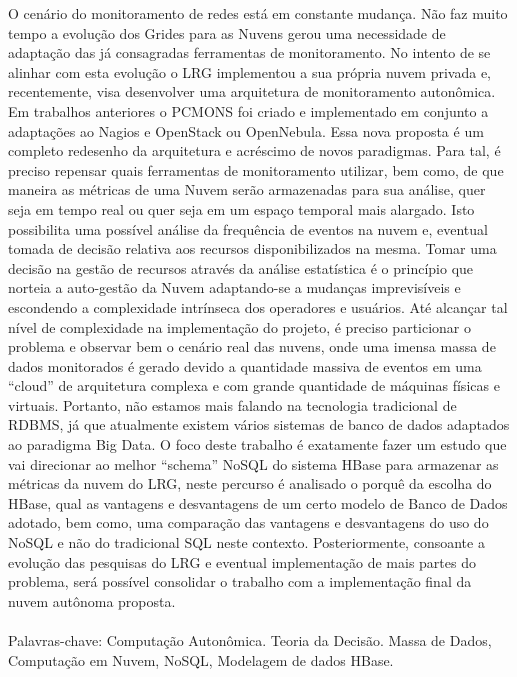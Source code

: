 \begin{resumo}

O cenário do monitoramento de redes está em constante mudança. Não faz muito
tempo a evolução dos Grides para as Nuvens gerou uma necessidade de adaptação
das já consagradas ferramentas de monitoramento. No intento de se alinhar com
esta evolução o LRG implementou a sua própria nuvem privada e, recentemente,
visa desenvolver uma arquitetura de monitoramento autonômica. Em trabalhos
anteriores o PCMONS foi criado e implementado em conjunto a adaptações ao Nagios
e OpenStack ou OpenNebula. Essa nova proposta é um completo redesenho da
arquitetura e acréscimo de novos paradigmas. Para tal, é preciso repensar quais
ferramentas de monitoramento utilizar, bem como, de que maneira as métricas de
uma Nuvem serão armazenadas para sua análise, quer seja em tempo real ou quer
seja em um espaço temporal mais alargado. Isto possibilita uma possível análise
da frequência de eventos na nuvem e, eventual tomada de decisão relativa aos
recursos disponibilizados na mesma. Tomar uma decisão na gestão de recursos
através da análise estatística é o princípio que norteia a auto-gestão da Nuvem
adaptando-se a mudanças imprevisíveis e escondendo a complexidade intrínseca dos
operadores e usuários. Até alcançar tal nível de complexidade na implementação
do projeto, é preciso particionar o problema e observar bem o cenário real das
nuvens, onde uma imensa massa de dados monitorados é gerado devido a quantidade
massiva de eventos em uma “cloud” de arquitetura complexa e com grande
quantidade de máquinas físicas e virtuais. Portanto, não estamos mais falando na
tecnologia tradicional de RDBMS, já que atualmente existem vários sistemas de
banco de dados adaptados ao paradigma Big Data. O foco deste trabalho é
exatamente fazer um estudo que vai direcionar ao melhor “schema” NoSQL do
sistema HBase para armazenar as métricas da nuvem do LRG, neste percurso é
analisado o porquê da escolha do HBase, qual as vantagens e desvantagens de um
certo modelo de Banco de Dados adotado, bem como, uma comparação das vantagens e
desvantagens do uso do NoSQL e não do tradicional SQL neste contexto.
Posteriormente, consoante a evolução das pesquisas do LRG e eventual
implementação de mais partes do problema, será possível consolidar o trabalho
com a implementação final da nuvem autônoma proposta. 
\\\\
\noindent
Palavras-chave: Computação Autonômica. Teoria da Decisão. Massa de Dados,
Computação em Nuvem, NoSQL, Modelagem de dados HBase.

\end{resumo}